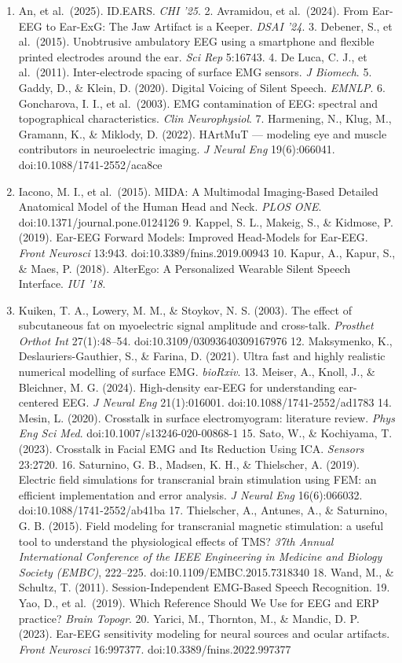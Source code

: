 \documentclass[
  11pt,
  letterpaper,
]{article}
\providecommand{\tightlist}{%
  \setlength{\itemsep}{0pt}\setlength{\parskip}{0pt}}
\providecommand{\tightlist}{%
  \setlength{\itemsep}{0pt}\setlength{\parskip}{0pt}}
\begin{document}
\begin{enumerate}
\def\labelenumi{\arabic{enumi}.}
\tightlist
\item
  An, et al.~(2025). ID.EARS. \emph{CHI '25}. 2. Avramidou, et al.~(2024). From
  Ear-EEG to Ear-ExG: The Jaw Artifact is a Keeper. \emph{DSAI '24}. 3. Debener, S., et
  al.~(2015). Unobtrusive ambulatory EEG using a smartphone and flexible printed
  electrodes around the ear. \emph{Sci Rep} 5:16743. 4. De Luca, C. J., et al.~(2011).
  Inter-electrode spacing of surface EMG sensors. \emph{J Biomech}. 5. Gaddy, D., \&
  Klein, D. (2020). Digital Voicing of Silent Speech. \emph{EMNLP}. 6. Goncharova, I.
  I., et al.~(2003). EMG contamination of EEG: spectral and topographical
  characteristics. \emph{Clin Neurophysiol}. 7. Harmening, N., Klug, M., Gramann, K., \&
  Miklody, D. (2022). HArtMuT --- modeling eye and muscle contributors in
  neuroelectric imaging. \emph{J Neural Eng} 19(6):066041. doi:10.1088/1741-2552/aca8ce
\item
  Iacono, M. I., et al.~(2015). MIDA: A Multimodal Imaging-Based Detailed
  Anatomical Model of the Human Head and Neck. \emph{PLOS ONE}.
  doi:10.1371/journal.pone.0124126 9. Kappel, S. L., Makeig, S., \& Kidmose, P.
  (2019). Ear-EEG Forward Models: Improved Head-Models for Ear-EEG. \emph{Front
  Neurosci} 13:943. doi:10.3389/fnins.2019.00943 10. Kapur, A., Kapur, S., \& Maes,
  P. (2018). AlterEgo: A Personalized Wearable Silent Speech Interface. \emph{IUI '18}.
\item
  Kuiken, T. A., Lowery, M. M., \& Stoykov, N. S. (2003). The effect of
  subcutaneous fat on myoelectric signal amplitude and cross-talk. \emph{Prosthet
  Orthot Int} 27(1):48--54. doi:10.3109/03093640309167976 12. Maksymenko, K.,
  Deslauriers-Gauthier, S., \& Farina, D. (2021). Ultra fast and highly realistic
  numerical modelling of surface EMG. \emph{bioRxiv}. 13. Meiser, A., Knoll, J., \&
  Bleichner, M. G. (2024). High-density ear-EEG for understanding ear-centered
  EEG. \emph{J Neural Eng} 21(1):016001. doi:10.1088/1741-2552/ad1783 14. Mesin, L.
  (2020). Crosstalk in surface electromyogram: literature review. \emph{Phys Eng Sci
  Med}. doi:10.1007/s13246-020-00868-1 15. Sato, W., \& Kochiyama, T. (2023).
  Crosstalk in Facial EMG and Its Reduction Using ICA. \emph{Sensors} 23:2720. 16.
  Saturnino, G. B., Madsen, K. H., \& Thielscher, A. (2019). Electric field
  simulations for transcranial brain stimulation using FEM: an efficient
  implementation and error analysis. \emph{J Neural Eng} 16(6):066032.
  doi:10.1088/1741-2552/ab41ba 17. Thielscher, A., Antunes, A., \& Saturnino, G. B.
  (2015). Field modeling for transcranial magnetic stimulation: a useful tool to
  understand the physiological effects of TMS? \emph{37th Annual International
  Conference of the IEEE Engineering in Medicine and Biology Society (EMBC)},
  222--225. doi:10.1109/EMBC.2015.7318340 18. Wand, M., \& Schultz, T. (2011).
  Session-Independent EMG-Based Speech Recognition. 19. Yao, D., et al.~(2019).
  Which Reference Should We Use for EEG and ERP practice? \emph{Brain Topogr}. 20.
  Yarici, M., Thornton, M., \& Mandic, D. P. (2023). Ear-EEG sensitivity modeling
  for neural sources and ocular artifacts. \emph{Front Neurosci} 16:997377.
  doi:10.3389/fnins.2022.997377
\end{enumerate}
\end{document}
